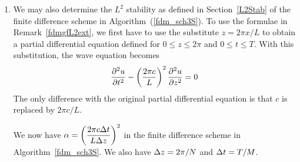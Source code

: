 \begin{rmkList} \label{dfmLastRmks}
\begin{enumerate}
\item We may also determine the $L^2$ stability as defined in
Section~\ref{L2Stab} of the finite difference scheme in
Algorithm~(\ref{fdm_sch3S}).  To use the formulae in
Remark~\ref{fdmgfL2ext}, we first have to use the substitute
$z = 2\pi x /L$ to obtain a partial 
differential equation defined for $0 \leq z \leq 2\pi$ and
$0 \leq t \leq T$.  With this substitution, the wave equation becomes
\[
  \frac{\partial^{2}{u}}{\partial{t}^{2}} - \left(\frac{2\pi c}{L}\right)^2 \frac{\partial^{2}{u}}{\partial{z}^{2}} = 0
\]
The only difference with the original partial differential equation is
that $c$ is replaced by $2\pi c/L$.  \label{dfmLastRmksItem1}

We now have
$\displaystyle \alpha = \left(\frac{2\pi c \Delta{t}}{L \Delta{z}}\right)^2$
in the finite difference scheme in Algorithm~\ref{fdm_sch3S}.  We also have
$\Delta{z} = 2\pi/N$ and $\Delta{t} = T/M$.


\end{enumerate}
\end{rmkList}
